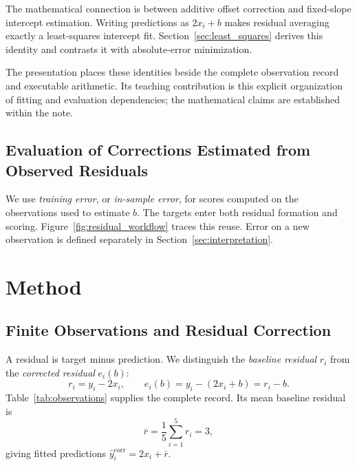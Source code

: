 \documentclass[11pt]{article}
\begin{document}
The mathematical connection is between additive offset correction and fixed-slope intercept estimation. Writing predictions as $2x_i+b$ makes residual averaging exactly a least-squares intercept fit. Section~\ref{sec:least_squares} derives this identity and contrasts it with absolute-error minimization.

The presentation places these identities beside the complete observation record and executable arithmetic. Its teaching contribution is this explicit organization of fitting and evaluation dependencies; the mathematical claims are established within the note.

\subsection{Evaluation of Corrections Estimated from Observed Residuals}

We use \emph{training error}, or \emph{in-sample error}, for scores computed on the observations used to estimate $b$. The targets enter both residual formation and scoring. Figure~\ref{fig:residual_workflow} traces this reuse. Error on a new observation is defined separately in Section~\ref{sec:interpretation}.

\section{Method}

\subsection{Finite Observations and Residual Correction}

A residual is target minus prediction. We distinguish the \emph{baseline residual} $r_i$ from the \emph{corrected residual} $e_i(b)$:
\[
r_i=y_i-2x_i,
\qquad
e_i(b)=y_i-(2x_i+b)=r_i-b.
\]
Table~\ref{tab:observations} supplies the complete record. Its mean baseline residual is
\[
\bar r=\frac{1}{5}\sum_{i=1}^{5}r_i=3,
\]
giving fitted predictions $\hat y_i^{\mathrm{corr}}=2x_i+\bar r$.
\end{document}
